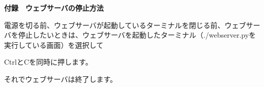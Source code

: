 \documentclass[a4paper,12pt,dvipdfmx]{jarticle}
\begin{document}
\bigskip

{\bfseries
付録　ウェブサーバの停止方法}

電源を切る前、ウェブサーバが起動しているターミナルを閉じる前、ウェブサーバを停止したいときは、ウェブサーバを起動したターミナル（./webserver.pyを実行している画面）を選択して


\bigskip

CtrlとCを同時に押します。


\bigskip

それでウェブサーバは終了します。


\bigskip


\bigskip


\bigskip
\end{document}
